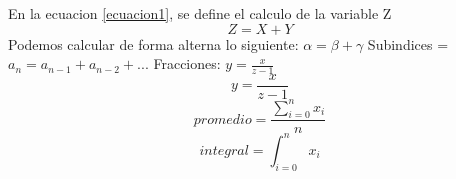 \documentclass[12pt]{book}
\begin{document}
En la ecuacion \ref{ecuacion1}, 
se define el calculo de la variable Z
\begin{equation}
\label{ecuacion1}
Z = X + Y
\end{equation}
Podemos calcular de forma alterna lo siguiente: 
$\alpha = \beta + \gamma$
Subindices = $a_n = a_{n-1} + a_{n-2} + ... $
Fracciones: $y = \frac{x}{z-1} $
\begin{equation}
\label{ecuacion2}
y = \frac{x}{z-1}
\end{equation}
\begin{equation}
\label{ecuacion3}
promedio = \frac{\sum_{i=0}^{n}x_i}{n}
\end{equation}
\begin{equation}
\label{ecuacion4}
integral = \int_{i=0}^{n}x_i
\end{equation}
\end{document}
